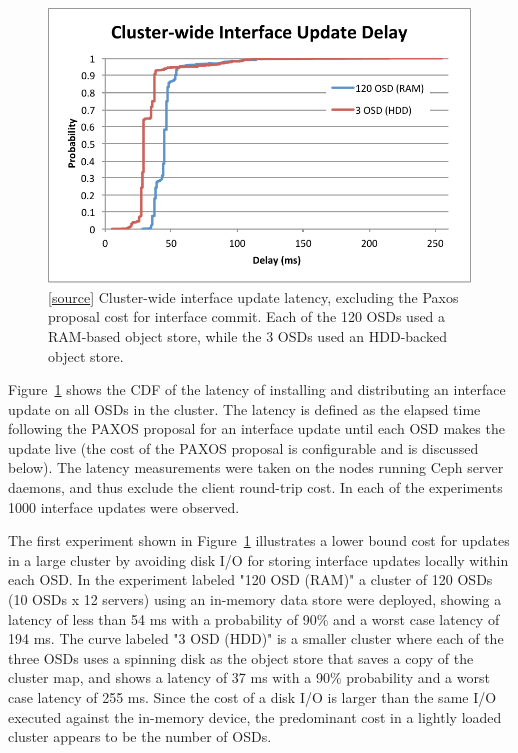 \documentclass[10pt,twocolumn]{article}
\begin{document}
\begin{figure}[h]
\centering
\includegraphics[trim={1 4 4 1.3cm},clip]{figures/iface-update-delay.pdf}
\caption{[\href{https://github.com/double-blind-submitter/osdi16}{source}]
Cluster-wide interface update latency, excluding the Paxos proposal cost for
interface commit. Each of the 120 OSDs used a RAM-based object store, while the
3 OSDs used an HDD-backed object store.}
\label{fig:propdelay}
\end{figure}

Figure~\ref{fig:propdelay} shows the CDF of the latency of installing and
distributing an interface update on all OSDs in the cluster. The latency is
defined as the elapsed time following the PAXOS proposal for an interface
update until each OSD makes the update live (the cost of the PAXOS proposal is
configurable and is discussed below). The latency measurements were taken on
the nodes running Ceph server daemons, and thus exclude the client round-trip
cost. In each of the experiments 1000 interface updates were observed.

The first experiment shown in Figure~\ref{fig:propdelay} illustrates a lower
bound cost for updates in a large cluster by avoiding disk I/O for storing
interface updates locally within each OSD.  In the experiment labeled "120 OSD
(RAM)" a cluster of 120 OSDs (10 OSDs x 12 servers) using an in-memory data
store were deployed, showing a latency of less than 54 ms with a probability
of 90\% and a worst case latency of 194 ms. The curve labeled "3 OSD (HDD)" is
a smaller cluster where each of the three OSDs uses a spinning disk as the
object store that saves a copy of the cluster map, and shows a latency of 37
ms with a 90\% probability and a worst case latency of 255 ms. Since the cost
of a disk I/O is larger than the same I/O executed against the in-memory
device, the predominant cost in a lightly loaded cluster appears to be the
number of OSDs.
\end{document}
